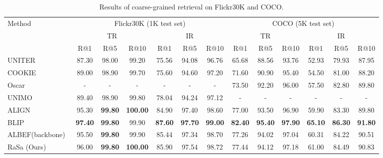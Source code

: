 \documentclass{article}
\begin{document}
\begin{table}
\small
\renewcommand\arraystretch{1.2}
\setlength{\tabcolsep}{4.2pt}
\centering
\begin{tabular}{l|cccccc|cccccc} 
\hline
\multirow{3}{*}{Method} & \multicolumn{6}{c|}{Flickr30K (1K test set)}                & \multicolumn{6}{c}{COCO (5K test set)}                         \\
                        & \multicolumn{3}{c}{TR} & \multicolumn{3}{c|}{IR} & \multicolumn{3}{c}{TR} & \multicolumn{3}{c}{IR}  \\
                        & R@1   & R@5   & R@10   & R@1   & R@5   & R@10    & R@1   & R@5   & R@10   & R@1   & R@5   & R@10    \\ 
\hline
UNITER~\cite{chen2020uniter}    & 87.30 & 98.00 & 99.20 & 75.56 & 94.08 & 96.76   & 65.68 & 88.56 & 93.76  & 52.93 & 79.93 & 87.95   \\
COOKIE~\cite{wen2021cookie}     & 89.00 & 98.90 & 99.70 & 75.60 & 94.60 & 97.20   & 71.60 & 90.90 & 95.40  & 54.50 & 81.00 & 88.20   \\
Oscar~\cite{li2020oscar}        & - & - & - & - & - & -   & 73.50 & 92.20 & 96.00  & 57.50 & 82.80 & 89.80   \\
UNIMO~\cite{li2021unimo}        & 89.40 & 98.90 & 99.80 & 78.04 & 94.24 & 97.12   & - & - & -  & - & - & -   \\
ALIGN~\cite{jia2021scaling}     & 95.30 & \textbf{99.80} & \textbf{100.00} & 84.90 & 97.40 & 98.60   & 77.00 & 93.50 & 96.90  & 59.90 & 83.30 & 89.80   \\
BLIP~\cite{li2022blip}          & \textbf{97.40} & \textbf{99.80} & 99.90 & \textbf{87.60} & \textbf{97.70} & \textbf{99.00}   & \textbf{82.40} & \textbf{95.40} & \textbf{97.90}  & \textbf{65.10} & \textbf{86.30} & \textbf{91.80}   \\
\hline
ALBEF(backbone)~\cite{NEURIPS2021_50525975}                   & 95.50 & \textbf{99.80} & 99.90  & 85.44 & 97.34 & 98.70   & 77.26 & 94.02 & 97.04  & 60.31 & 84.22 & 90.51   \\
RaSa (Ours)                     & 96.00 & \textbf{99.80} & \textbf{100.00} & 85.90 & 97.54 & 98.72   & 77.44 & 94.12 & 97.18  & 61.00 & 84.49 & 90.83   \\
\hline
\end{tabular}
\caption{Results of coarse-grained retrieval on Flickr30K and COCO.}
\label{table5}
\end{table}
\end{document}

